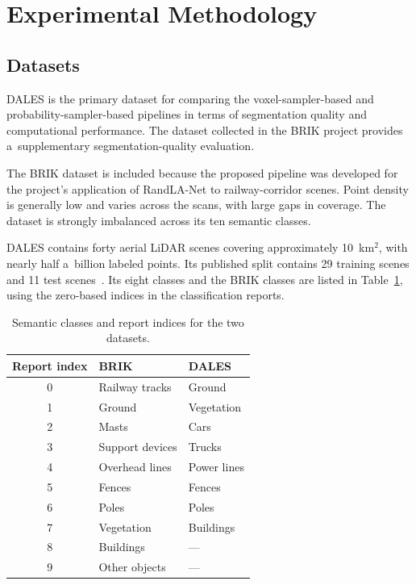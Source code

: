 \section{Experimental Methodology}

\subsection{Datasets}

DALES is the primary dataset for comparing the voxel-sampler-based and probability-sampler-based pipelines in terms of segmentation quality and computational performance. The dataset collected in the BRIK project provides a~supplementary segmentation-quality evaluation.

The BRIK dataset is included because the proposed pipeline was developed for the project's application of RandLA-Net to railway-corridor scenes. Point density is generally low and varies across the scans, with large gaps in coverage. The dataset is strongly imbalanced across its ten semantic classes.

DALES contains forty aerial LiDAR scenes covering approximately 10~km$^2$, with nearly half a~billion labeled points. Its published split contains 29 training scenes and 11 test scenes~\citep{dales}. Its eight classes and the BRIK classes are listed in Table~\ref{tab:dataset_classes}, using the zero-based indices in the classification reports.

\begin{table}[H]
  \centering
  \caption{Semantic classes and report indices for the two datasets.}
  \label{tab:dataset_classes}
  \begin{tabular}{cll}
    \toprule
    Report index & BRIK & DALES \\
    \midrule
    0 & Railway tracks & Ground \\
    1 & Ground & Vegetation \\
    2 & Masts & Cars \\
    3 & Support devices & Trucks \\
    4 & Overhead lines & Power lines \\
    5 & Fences & Fences \\
    6 & Poles & Poles \\
    7 & Vegetation & Buildings \\
    8 & Buildings & --- \\
    9 & Other objects & --- \\
    \bottomrule
  \end{tabular}
\end{table}

